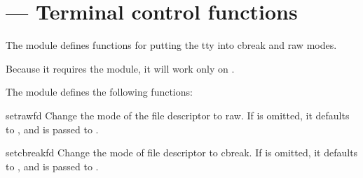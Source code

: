 \section{ ---
         Terminal control functions}


The  module defines functions for putting the tty into
cbreak and raw modes.

Because it requires the  module, it will work
only on \UNIX{}.

The  module defines the following functions:

\begin{funcdesc}{setraw}{fd}
Change the mode of the file descriptor  to raw. If 
is omitted, it defaults to , and is passed
to .
\end{funcdesc}

\begin{funcdesc}{setcbreak}{fd}
Change the mode of file descriptor  to cbreak. If 
is omitted, it defaults to , and is passed
to .
\end{funcdesc}


\begin{seealso}
\end{seealso}
